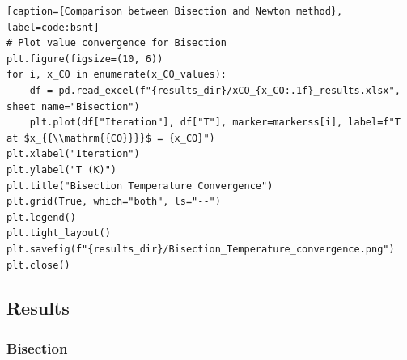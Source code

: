 \documentclass[10pt]{article}
\begin{document}
\begin{lstlisting}[style=custompython][caption={Comparison between Bisection and Newton method}, label=code:bsnt]
# Plot value convergence for Bisection
plt.figure(figsize=(10, 6))
for i, x_CO in enumerate(x_CO_values):
    df = pd.read_excel(f"{results_dir}/xCO_{x_CO:.1f}_results.xlsx", sheet_name="Bisection")
    plt.plot(df["Iteration"], df["T"], marker=markerss[i], label=f"T at $x_{{\\mathrm{{CO}}}}$ = {x_CO}")
plt.xlabel("Iteration")
plt.ylabel("T (K)")
plt.title("Bisection Temperature Convergence")
plt.grid(True, which="both", ls="--")
plt.legend()
plt.tight_layout()
plt.savefig(f"{results_dir}/Bisection_Temperature_convergence.png")
plt.close()

\end{lstlisting}


\newpage
\subsection{Results}
\subsubsection{Bisection}
\end{document}
